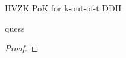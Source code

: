 \begin{solution}{HVZK PoK for k-out-of-t DDH}\label{ques:1}
    \begin{question}
    quess
    \end{question}
    \tcblower{}
    \begin{proof}
    \end{proof}
\end{solution}
